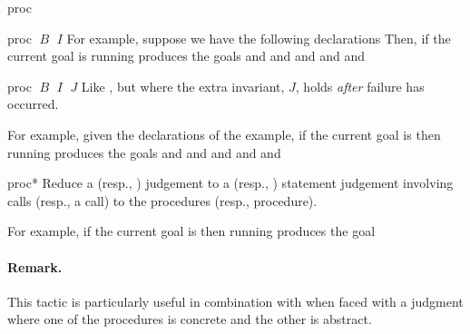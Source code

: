 \begin{tactic}{proc}
\begin{tsyntax}{proc $\;B$ $\;I$}
  \bigskip
  For example, suppose we have the following declarations
  Then, if the current goal is
  running 
  produces the goals
  and
  and
  and
  and
  and
  \end{tsyntax}

  \begin{tsyntax}{proc $\;B$ $\;I$ $\;J$}
    Like , but where the extra invariant, $J$,
    holds \emph{after} failure has occurred.

  \bigskip
  For example, given the declarations of the  example,
  if the current goal is
   then
  running 
  produces the goals
  and
  and
  and
  and
  and
  \end{tsyntax}

  \begin{tsyntax}{proc*}
    Reduce a \prhl (resp., \phl) judgement to a \prhl (resp., \phl)
    statement judgement involving calls (resp., a call) to the
    procedures (resp., procedure).

  \bigskip
  For example, if the current goal is
   then
  running 
  produces the goal

  \paragraph{Remark.}
  This tactic is particularly useful in combination with
   when faced with a \prhl judgment where one of the
  procedures is concrete and the other is abstract.
  \end{tsyntax}
\end{tactic}
